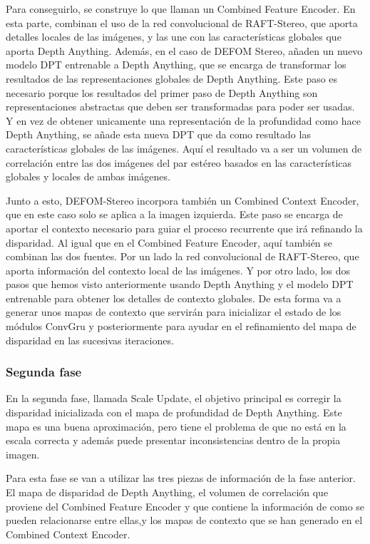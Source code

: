 Para conseguirlo, se construye lo que llaman un Combined Feature Encoder. En esta parte, combinan el uso de la red convolucional de RAFT-Stereo, que aporta detalles locales de las imágenes, y las une con las características globales que aporta Depth Anything. Además, en el caso de DEFOM Stereo, añaden un nuevo modelo DPT entrenable a Depth Anything, que se encarga de transformar los resultados de las representaciones globales de Depth Anything. Este paso es necesario porque los resultados del primer paso de Depth Anything son representaciones abstractas que deben ser transformadas para poder ser usadas. Y en vez de obtener unicamente una representación de la profundidad como hace Depth Anything, se añade esta nueva DPT que da como resultado las características globales de las imágenes. Aquí el resultado va a ser un volumen de correlación entre las dos imágenes del par estéreo basados en las características globales y locales de ambas imágenes.

Junto a esto, DEFOM-Stereo incorpora también un Combined Context Encoder, que en este caso solo se aplica a la imagen izquierda. Este paso se encarga de aportar el contexto necesario para guiar el proceso recurrente que irá refinando la disparidad. Al igual que en el Combined Feature Encoder, aquí también se combinan las dos fuentes. Por un lado la red convolucional de RAFT-Stereo, que aporta información del contexto local de las imágenes. Y por otro lado, los dos pasos que hemos visto anteriormente usando Depth Anything y el modelo DPT entrenable para obtener los detalles de contexto globales. De esta forma va a generar unos mapas de contexto que servirán para inicializar el estado de los módulos ConvGru y posteriormente para ayudar en el refinamiento del mapa de disparidad en las sucesivas iteraciones.

\subsubsection{Segunda fase}
En la segunda fase, llamada Scale Update, el objetivo principal es corregir la disparidad inicializada con el mapa de profundidad de Depth Anything. Este mapa es una buena aproximación, pero tiene el problema de que no está en la escala correcta y además puede presentar inconsistencias dentro de la propia imagen.

Para esta fase se van a utilizar las tres piezas de información de la fase anterior. El mapa de disparidad de Depth Anything, el volumen de correlación que proviene del Combined Feature Encoder y que contiene la información de como se pueden relacionarse entre ellas,y los mapas de contexto que se han generado en el Combined Context Encoder.


